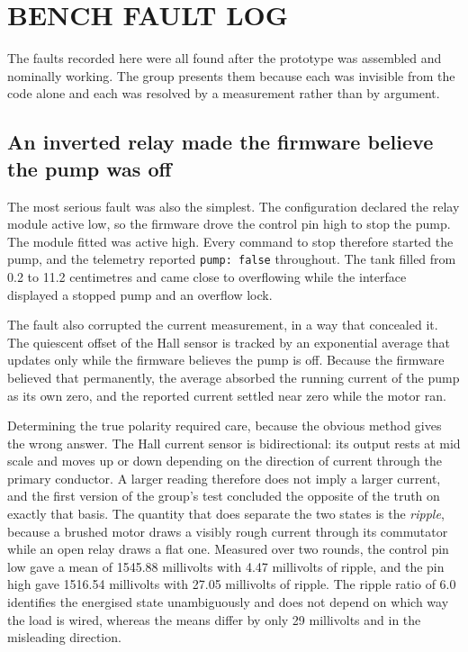 \chapter{BENCH FAULT LOG}
\label{app:bench}
The faults recorded here were all found after the prototype was assembled and nominally working. The group presents them because each was invisible from the code alone and each was resolved by a measurement rather than by argument.

\section{An inverted relay made the firmware believe the pump was off}

The most serious fault was also the simplest. The configuration declared the relay module active low, so the firmware drove the control pin high to stop the pump. The module fitted was active high. Every command to stop therefore started the pump, and the telemetry reported \texttt{pump: false} throughout. The tank filled from 0.2 to 11.2 centimetres and came close to overflowing while the interface displayed a stopped pump and an overflow lock.

The fault also corrupted the current measurement, in a way that concealed it. The quiescent offset of the Hall sensor is tracked by an exponential average that updates only while the firmware believes the pump is off. Because the firmware believed that permanently, the average absorbed the running current of the pump as its own zero, and the reported current settled near zero while the motor ran.

Determining the true polarity required care, because the obvious method gives the wrong answer. The Hall current sensor is bidirectional: its output rests at mid scale and moves up or down depending on the direction of current through the primary conductor. A larger reading therefore does not imply a larger current, and the first version of the group's test concluded the opposite of the truth on exactly that basis. The quantity that does separate the two states is the \emph{ripple}, because a brushed motor draws a visibly rough current through its commutator while an open relay draws a flat one. Measured over two rounds, the control pin low gave a mean of 1545.88 millivolts with 4.47 millivolts of ripple, and the pin high gave 1516.54 millivolts with 27.05 millivolts of ripple. The ripple ratio of 6.0 identifies the energised state unambiguously and does not depend on which way the load is wired, whereas the means differ by only 29 millivolts and in the misleading direction.

